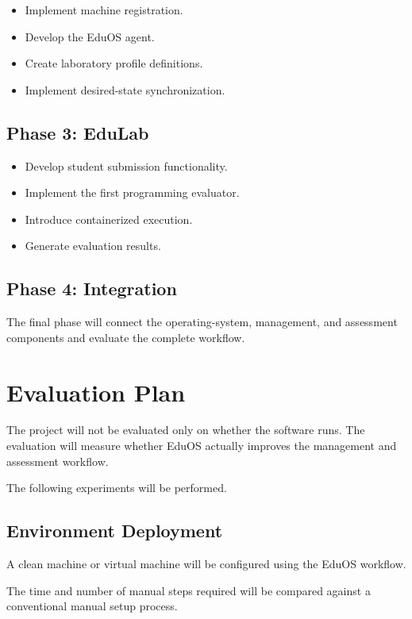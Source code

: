 \documentclass[12pt,a4paper]{article}
\begin{document}
\begin{itemize}
    \item Implement machine registration.
    \item Develop the EduOS agent.
    \item Create laboratory profile definitions.
    \item Implement desired-state synchronization.
\end{itemize}

\subsection{Phase 3: EduLab}

\begin{itemize}
    \item Develop student submission functionality.
    \item Implement the first programming evaluator.
    \item Introduce containerized execution.
    \item Generate evaluation results.
\end{itemize}

\subsection{Phase 4: Integration}

The final phase will connect the operating-system, management, and assessment components and evaluate the complete workflow.

\section{Evaluation Plan}

The project will not be evaluated only on whether the software runs. The evaluation will measure whether EduOS actually improves the management and assessment workflow.

The following experiments will be performed.

\subsection{Environment Deployment}

A clean machine or virtual machine will be configured using the EduOS workflow.

The time and number of manual steps required will be compared against a conventional manual setup process.
\end{document}
